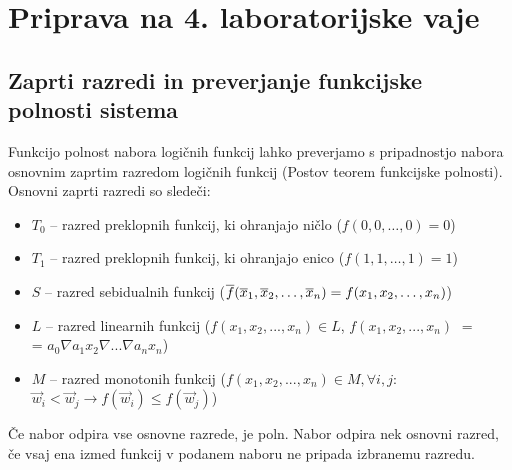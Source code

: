 \chapter{Priprava na 4. laboratorijske vaje}

\section{Zaprti razredi in preverjanje funkcijske polnosti sistema}

Funkcijo polnost nabora logičnih funkcij lahko preverjamo s pripadnostjo nabora osnovnim zaprtim razredom logičnih funkcij (Postov teorem funkcijske polnosti). Osnovni zaprti razredi so sledeči:
\begin{itemize}
\item $T_0$ -- razred preklopnih funkcij, ki ohranjajo ničlo ($f(0,0,\ldots,0) = 0$)
\item $T_1$ -- razred preklopnih funkcij, ki ohranjajo enico ($f(1,1,\ldots,1) = 1$)
\item $S$ -- razred sebidualnih funkcij ($\overline f (\overline x_1,\overline x_2,\ldots,\overline x_n) = f(x_1,x_2,\ldots,x_n)$)
\item $L$ -- razred linearnih funkcij ($f(x_1, x_2,...,x_n) \in L$, $f(x_1,x_2,...,x_n)$ $=$ \\= $a_0 \nabla a_1 x_2 \nabla ... \nabla a_n x_n$)
\item $M$ -- razred monotonih funkcij ($f(x_1, x_2,...,x_n) \in M, \forall i,j: $ \\$\vec{w}_i < \vec{w}_j \rightarrow f(\vec{w}_i) \leq f(\vec{w}_j)$)
\end{itemize}
Če nabor odpira vse osnovne razrede, je poln. Nabor odpira nek osnovni razred, če vsaj ena izmed funkcij v podanem naboru ne pripada izbranemu razredu. 


